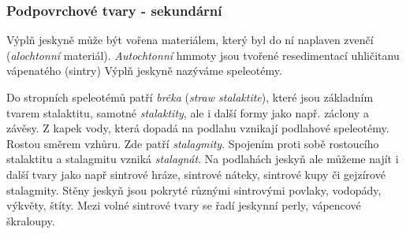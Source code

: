 %
\subsubsection{Podpovrchové tvary - sekundární}
Výplň jeskyně může být vořena materiálem, který byl do ní naplaven zvenčí (\emph{alochtonní} materiál). \emph{Autochtonní} hmmoty jsou tvořené resedimentací uhličitanu vápenatého (sintry) Výplň jeskyně nazýváme speleotémy. 

Do stropních speleotémů patří \emph{brčka} (\textit{straw stalaktite}), které jsou základním tvarem stalaktitu, samotné \emph{stalaktity}, ale i další formy jako např. záclony a závěsy. Z kapek vody, která dopadá na podlahu vznikají podlahové speleotémy. Rostou směrem vzhůru. Zde patří \emph{stalagmity}. Spojením proti sobě rostoucího stalaktitu a stalagmitu vzniká \emph{stalagnát}. Na podlahách jeskyň ale můžeme najít i další tvary jako např sintrové hráze, sintrové náteky, sintrové kupy či gejzírové stalagmity. Stěny jeskyň jsou pokryté různými sintrovými povlaky, vodopády, výkvěty, štíty. Mezi volné sintrové tvary se řadí jeskynní perly, vápencové škraloupy.


